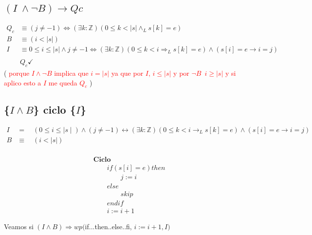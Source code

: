 \documentclass[12pt]{book}
\begin{document}
\subsection{ $ (I \ \land \neg B) \rightarrow Qc$ }

\begin{align*}
Q_c &\equiv (j \neq -1)  \Leftrightarrow (\exists k: \mathbb{Z})(0 \leq k < |s| \land_L s[k] = e)  \\
B   &\equiv (i < |s|) \\
I &\equiv 0 \leq i \leq |s| \land j\neq -1 \Leftrightarrow (\exists k:\mathbb{Z})(0\leq k < i \Rightarrow_L s[k] = e)\wedge (s[i] = e \rightarrow i = j) \\ \\
& Q_c \checkmark 
\end{align*}
( \textcolor{red}{porque $I\land \neg B$ implica que $i = |s|$ ya que por $I $,  $ i \leq |s|$ y por $\neg B$\, $i \geq |s| $ y si aplico esto a $I$ me queda $Q_c$ }) 
\vspace{0.2cm}
\subsection{ \{$I\land B$\} ciclo  \{$I$\} }
\begin{align*}
I &= \quad (0 \leq i \leq  \mid s \mid) \wedge (j \neq -1) \leftrightarrow (\exists k : \mathbb{Z})(0 \leq k < i \rightarrow_L s[k] = e) \wedge (s[i] = e \rightarrow i = j) \\
B &\equiv \quad  (i < |s|) \\
\end{align*}
\begin{shaded}
\begin{align*}
& \textbf{Ciclo} \\
& \qquad if (s[i] = e)  then  \\
& \qquad \qquad j:= i \\
& \qquad else \\
& \qquad \qquad skip \\
& \qquad endif \\
& \qquad i:= i + 1 
\end{align*}
\end{shaded}
Veamos si $ (I \land B) \Rightarrow wp( $if...then..else..fi,  $ i := i +1, I ) $
\end{document}
